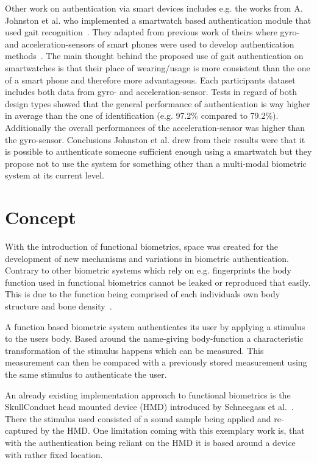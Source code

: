 Other work on authentication via smart devices includes e.g. the works from A. Johnston et al. who implemented a smartwatch based authentication module that used gait recognition~\cite{johnston2015smartwatch}.
They adapted from previous work of theirs where gyro- and acceleration-sensors of smart phones were used to develop authentication methods~\cite{kwapisz2010cell}.
The main thought behind the proposed use of gait authentication on smartwatches is that their place of wearing/usage is more consistent than the one of a smart phone and therefore more advantageous.
Each participants dataset includes both data from gyro- and acceleration-sensor.
Tests in regard of both design types showed that the general performance of authentication is way higher in average than the one of identification (e.g. 97.2\% compared to 79.2\%).
Additionally the overall performances of the acceleration-sensor was higher than the gyro-sensor.
Conclusions Johnston et al. drew from their results were that it is possible to authenticate someone sufficient enough using a smartwatch but they propose not to use the system for something other than a multi-modal biometric system at its current level. 
\newpage

\section{Concept}
With the introduction of functional biometrics, space was created for the development of new mechanisms and variations in biometric authentication.
Contrary to other biometric systems which rely on e.g. fingerprints the body function used in functional biometrics cannot be leaked or reproduced that easily.
This is due to the function being comprised of each individuals own body structure and bone density~\cite{schneegass2020functbiometric}.

A function based biometric system authenticates its user by applying a stimulus to the users body.
Based around the name-giving body-function a characteristic transformation of the stimulus happens which can be measured.
This measurement can then be compared with a previously stored measurement using the same stimulus to authenticate the user.

An already existing implementation approach to functional biometrics is the SkullConduct head mounted device (HMD) introduced by Schneegass et al.~\cite{SkullConduct}.
There the stimulus used consisted of a sound sample being applied and re-captured by the HMD.
One limitation coming with this exemplary work is, that with the authentication being reliant on the HMD it is based around a device with rather fixed location.

